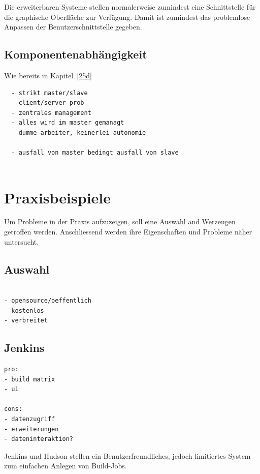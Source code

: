 Die erweiterbaren Systeme stellen normalerweise zumindest eine Schnittstelle
f\"ur die graphische Oberfl\"ache zur Verf\"ugung.
Damit ist zumindest das problemlose Anpassen der Benutzerschnittstelle gegeben.




\subsection{Komponentenabh\"angigkeit}

Wie bereits in Kapitel~\ref{25d}

\begin{verbatim}
  - strikt master/slave
  - client/server prob
  - zentrales management
  - alles wird im master gemanagt
  - dumme arbeiter, keinerlei autonomie

  - ausfall von master bedingt ausfall von slave


\end{verbatim}

\section{Praxisbeispiele}

Um Probleme in der Praxis aufzuzeigen,
soll eine Auswahl and Werzeugen getroffen werden.
Anschliessend werden ihre Eigenschaften und Probleme n\"aher untersucht.


\subsection{Auswahl}




\begin{verbatim}

- opensource/oeffentlich
- kostenlos
- verbreitet

\end{verbatim}

\subsection{Jenkins}

\begin{verbatim}
pro:
- build matrix
- ui

cons:
- datenzugriff
- erweiterungen
- dateninteraktion?

\end{verbatim}

Jenkins und Hudson stellen ein Benutzerfreundliches,
jedoch limitiertes System zum einfachen Anlegen von Build-Jobs.

